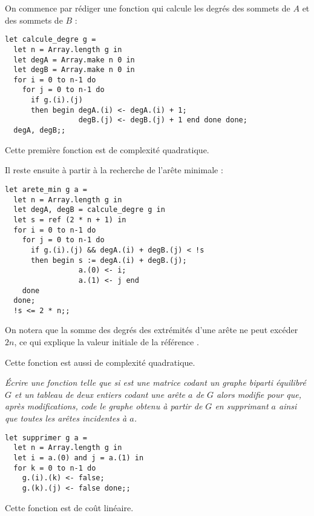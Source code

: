 \begin{Answer}
On commence par rédiger une fonction qui calcule les degrés des sommets de $A$ et des sommets de $B$ :
\begin{lstlisting}
let calcule_degre g =
  let n = Array.length g in
  let degA = Array.make n 0 in
  let degB = Array.make n 0 in
  for i = 0 to n-1 do
    for j = 0 to n-1 do
      if g.(i).(j) 
      then begin degA.(i) <- degA.(i) + 1; 
                 degB.(j) <- degB.(j) + 1 end done done;
  degA, degB;;
\end{lstlisting}
Cette première fonction est de complexité quadratique.

Il reste ensuite à partir à la recherche de l'arête minimale :
\begin{lstlisting}
let arete_min g a =
  let n = Array.length g in
  let degA, degB = calcule_degre g in
  let s = ref (2 * n + 1) in
  for i = 0 to n-1 do
    for j = 0 to n-1 do
      if g.(i).(j) && degA.(i) + degB.(j) < !s 
      then begin s := degA.(i) + degB.(j); 
                 a.(0) <- i; 
                 a.(1) <- j end
    done
  done;
  !s <= 2 * n;;
\end{lstlisting}
On notera que la somme des degrés des extrémités d'une arête ne peut excéder $2n$, ce qui explique la valeur initiale de la référence .

Cette fonction est aussi de complexité quadratique.

\end{Answer}
\newpage
\begin{Exercise}\it
Écrire une fonction  telle que si  est une matrice codant un graphe biparti équilibré $G$ et un tableau de deux entiers codant une arête $a$ de $G$ alors  modifie  pour que, après modifications,  code le graphe obtenu à partir de $G$ en supprimant $a$ ainsi que toutes les arêtes incidentes à $a$.
\end{Exercise}
\begin{Answer}
\begin{lstlisting}
let supprimer g a =
  let n = Array.length g in
  let i = a.(0) and j = a.(1) in
  for k = 0 to n-1 do
    g.(i).(k) <- false; 
    g.(k).(j) <- false done;;
\end{lstlisting}
\end{Answer}
Cette fonction est de coût linéaire.


